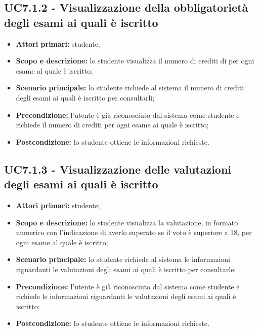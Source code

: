 \documentclass[AnalisiDeiRequisiti.tex]{subfiles}
\begin{document}
\subsection{UC7.1.2 - Visualizzazione della obbligatorietà degli esami ai quali è iscritto}
\begin{itemize}
	\item \textbf{Attori primari:} studente;
	\item \textbf{Scopo e descrizione:} lo studente visualizza il numero di crediti di per ogni esame al quale è iscritto;
	\item \textbf{Scenario principale:} lo studente richiede al sistema il numero di crediti degli esami ai quali è iscritto per consultarli;
	\item \textbf{Precondizione:} l'utente è già riconosciuto dal sistema come studente e richiede il numero di crediti per ogni esame ai quale è iscritto;
	\item \textbf{Postcondizione:} lo studente ottiene le informazioni richieste.
\end{itemize}

\subsection{UC7.1.3 - Visualizzazione delle valutazioni degli esami ai quali è iscritto}
\begin{itemize}
	\item \textbf{Attori primari:} studente;
	\item \textbf{Scopo e descrizione:} lo studente visualizza la valutazione, in formato numerico con l'indicazione di averlo superato se il voto è superiore a 18, per ogni esame al quale è iscritto;
	\item \textbf{Scenario principale:} lo studente richiede al sistema le informazioni riguardanti le valutazioni degli esami ai quali è iscritto per consultarle;
	\item \textbf{Precondizione:} l'utente è già riconosciuto dal sistema come studente e richiede le informazioni riguardanti le valutazioni degli esami ai quali è iscritto;
	\item \textbf{Postcondizione:} lo studente ottiene le informazioni richieste.
\end{itemize}
\end{document}
